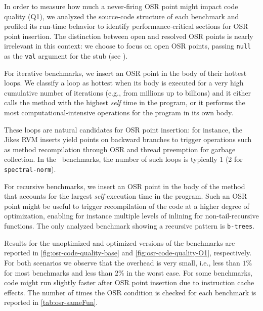 In order to measure how much a never-firing OSR point might impact code quality (Q1), we analyzed the source-code structure of each benchmark and profiled its run-time behavior to identify performance-critical sections for OSR point insertion. The distinction between open and resolved OSR points is nearly irrelevant in this context: we choose to focus on open OSR points, passing {\tt null} as the {\tt val} argument for the stub (see \missing).

For iterative benchmarks, we insert an OSR point in the body of their hottest loops. We classify a loop as hottest when its body is executed for a very high cumulative number of iterations (e.g., from millions up to billions) and it either calls the method with the highest {\em self} time in the program, or it performs the most computational-intensive operations for the program in its own body.

These loops are natural candidates for OSR point insertion: for instance, the Jikes RVM inserts yield points on backward branches to trigger operations such as method recompilation through OSR and thread preemption for garbage collection. In the \shootout\ benchmarks, the number of such loops is typically 1 (2 for {\tt spectral-norm}).

For recursive benchmarks, we insert an OSR point in the body of the method that accounts for the largest {\em self} execution time in the program. Such an OSR point might be useful to trigger recompilation of the code at a higher degree of optimization, enabling for instance multiple levels of inlining for non-tail-recursive functions. The only analyzed benchmark showing a recursive pattern is {\tt b-trees}.

Results for the unoptimized and optimized versions of the benchmarks are reported in \myfigure\ref{fig:osr-code-quality-base} and \myfigure\ref{fig:osr-code-quality-O1}, respectively. For both scenarios we observe that the overhead is very small, i.e., less than $1\%$ for most benchmarks and less than $2\%$ in the worst case. For some benchmarks, code might run slightly faster after OSR point insertion due to instruction cache effects.
The number of times the OSR condition is checked for each benchmark is
reported in \mytable\ref{tab:osr-sameFun}.

